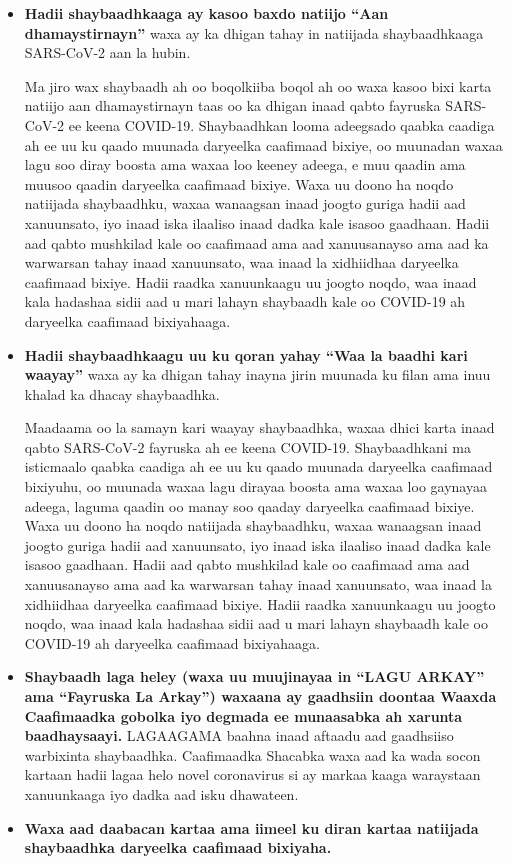 \documentclass[10pt]{article}
\begin{document}
\begin{itemize}
\item

  \textbf{Hadii shaybaadhkaaga ay kasoo baxdo natiijo ``Aan dhamaystirnayn''}
  waxa ay ka dhigan tahay in natiijada shaybaadhkaaga SARS-CoV-2 aan la hubin.

  Ma jiro wax shaybaadh ah oo boqolkiiba boqol ah oo waxa kasoo bixi karta
  natiijo aan dhamaystirnayn taas oo ka dhigan inaad qabto fayruska SARS-CoV-2
  ee keena COVID-19.  Shaybaadhkan looma adeegsado qaabka caadiga ah ee uu ku
  qaado muunada daryeelka caafimaad bixiye, oo muunadan waxaa lagu soo diray
  boosta ama waxaa loo keeney adeega, e muu qaadin ama muusoo qaadin daryeelka
  caafimaad bixiye.  Waxa uu doono ha noqdo natiijada shaybaadhku, waxaa
  wanaagsan inaad joogto guriga hadii aad xanuunsato, iyo inaad iska ilaaliso
  inaad dadka kale isasoo gaadhaan. Hadii aad qabto mushkilad kale oo caafimaad
  ama aad xanuusanayso ama aad ka warwarsan tahay inaad xanuunsato, waa inaad la
  xidhiidhaa daryeelka caafimaad bixiye.  Hadii raadka xanuunkaagu uu joogto
  noqdo, waa inaad kala hadashaa sidii aad u mari lahayn shaybaadh kale oo
  COVID-19 ah daryeelka caafimaad bixiyahaaga.

\item

  \textbf{Hadii shaybaadhkaagu uu ku qoran yahay ``Waa la baadhi kari waayay''}
  waxa ay ka dhigan tahay inayna jirin muunada ku filan ama inuu khalad ka
  dhacay shaybaadhka.

  Maadaama oo la samayn kari waayay shaybaadhka, waxaa dhici karta inaad qabto
  SARS-CoV-2 fayruska ah ee keena COVID-19.  Shaybaadhkani ma isticmaalo qaabka
  caadiga ah ee uu ku qaado muunada daryeelka caafimaad bixiyuhu, oo muunada
  waxaa lagu dirayaa boosta ama waxaa loo gaynayaa adeega, laguma qaadin oo
  manay soo qaaday daryeelka caafimaad bixiye. Waxa uu doono ha noqdo natiijada
  shaybaadhku, waxaa wanaagsan inaad joogto guriga hadii aad xanuunsato, iyo
  inaad iska ilaaliso inaad dadka kale isasoo gaadhaan. Hadii aad qabto
  mushkilad kale oo caafimaad ama aad xanuusanayso ama aad ka warwarsan tahay
  inaad xanuunsato, waa inaad la xidhiidhaa daryeelka caafimaad bixiye.  Hadii
  raadka xanuunkaagu uu joogto noqdo, waa inaad kala hadashaa sidii aad u mari
  lahayn shaybaadh kale oo COVID-19 ah daryeelka caafimaad bixiyahaaga.

\item

  \textbf{Shaybaadh laga heley (waxa uu muujinayaa in ``LAGU ARKAY'' ama
  ``Fayruska La Arkay'') waxaana ay gaadhsiin doontaa Waaxda Caafimaadka gobolka
  iyo degmada ee munaasabka ah xarunta baadhaysaayi.} LAGAAGAMA baahna inaad
  aftaadu aad gaadhsiiso warbixinta shaybaadhka. Caafimaadka Shacabka waxa aad
  ka wada socon kartaan hadii lagaa helo novel coronavirus si ay markaa kaaga
  waraystaan xanuunkaaga iyo dadka aad isku dhawateen.

\item

  \textbf{Waxa aad daabacan kartaa ama iimeel ku diran kartaa natiijada
  shaybaadhka daryeelka caafimaad bixiyaha.}

\end{itemize}
\end{document}
